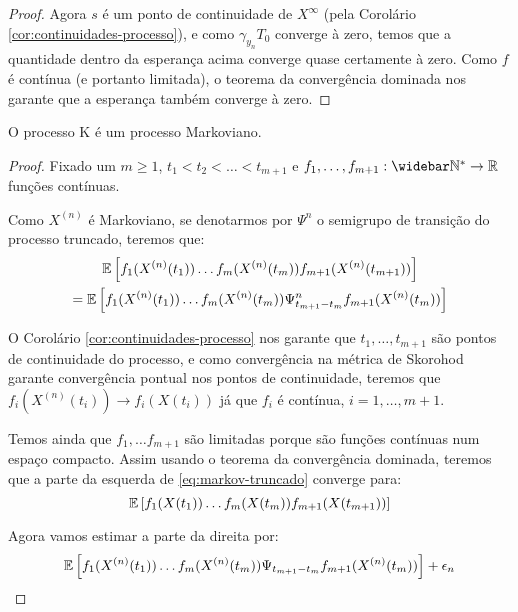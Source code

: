 \begin{proof}
  Agora $s$ é \qc um ponto de continuidade de $X^\infty$ (pela
  Corolário \ref{cor:continuidades-processo}), e como $\gamma_{y_n}
  T_0$ converge à zero, temos que a quantidade dentro da esperança
  acima converge quase certamente à zero. Como $f$ é contínua (e
  portanto limitada), o teorema da convergência dominada nos garante
  que a esperança também converge à zero.
\end{proof}


\begin{teorema}
  \label{teo:proc_markov}
  O processo K é um processo Markoviano.
\end{teorema}

\begin{proof}
  Fixado um $m \geq 1$, $t_1 < t_2 < \ldots < t_{m+1}$ e $f_1, \ldots,
  f_{m+1} : \Nzb \to \R$ funções contínuas.

  Como $X^{(n)}$ é Markoviano, se denotarmos por $\Psi^n$ o semigrupo
  de transição do processo truncado, teremos que:
  \begin{gather}
    \label{eq:markov-truncado}
    {\mathbb{E}} \left[
      f_{1}(X^{(n)}(t_{1})) 
      \ldots
      f_{m}(X^{(n)}(t_{m})) 
      f_{m+1}(X^{(n)}(t_{m+1})) 
    \right] \\
    = {\mathbb{E}} \left[
      f_{1}(X^{(n)}(t_{1})) 
      \ldots
      f_{m}(X^{(n)}(t_{m})) 
      \Psi^n_{t_{m+1} - t_{m}} f_{m+1} (X^{(n)}(t_{m})) 
    \right]\notag
  \end{gather}

  O Corolário \ref{cor:continuidades-processo} nos garante que \qc
  $t_1, \ldots, t_{m+1}$ são pontos de continuidade do processo, e
  como convergência na métrica de Skorohod garante convergência
  pontual nos pontos de continuidade, teremos que $f_i(X^{(n)}(t_i)) \to
  f_i(X(t_i))$ \qc já que $f_i$ é contínua, $i = 1, \ldots, m+1$.

  Temos ainda que $f_1, \ldots f_{m+1}$ são limitadas porque são
  funções contínuas num espaço compacto. Assim usando o teorema da
  convergência dominada, teremos que a parte da esquerda de
  \eqref{eq:markov-truncado} converge para:
  \begin{displaymath}
    {\mathbb{E}} \left[
      f_{1}(X(t_{1})) 
      \ldots
      f_{m}(X(t_{m})) 
      f_{m+1}(X(t_{m+1})) 
    \right]
  \end{displaymath}

  Agora vamos estimar a parte da direita por:
  \begin{equation}
    \label{eq:markov-est-eps}
    {\mathbb{E}} \left[
      f_{1}(X^{(n)}(t_{1})) 
      \ldots
      f_{m}(X^{(n)}(t_{m})) 
      \Psi_{t_{m+1} - t_{m}} f_{m+1} (X^{(n)}(t_{m})) 
    \right] + \epsilon_n
  \end{equation}


\end{proof}
